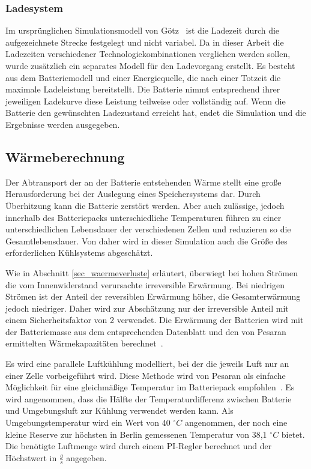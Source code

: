 \subsubsection{Ladesystem}
Im ursprünglichen Simulationsmodell von Götz~\cite{Gotz:2013} ist die Ladezeit durch die aufgezeichnete Strecke festgelegt und nicht variabel. Da in dieser Arbeit die Ladezeiten verschiedener Technologiekombinationen verglichen werden sollen, wurde zusätzlich ein separates Modell für den Ladevorgang erstellt. Es besteht aus dem Batteriemodell und einer Energiequelle, die nach einer Totzeit die maximale Ladeleistung bereitstellt. Die Batterie nimmt entsprechend ihrer jeweiligen Ladekurve diese Leistung teilweise oder vollständig auf. Wenn die Batterie den gewünschten Ladezustand erreicht hat, endet die Simulation und die Ergebnisse werden ausgegeben.

\subsection{Wärmeberechnung}
Der Abtransport der an der Batterie entstehenden Wärme stellt eine große Herausforderung bei der Auslegung eines Speichersystems dar. Durch Überhitzung kann die Batterie zerstört werden. Aber auch zulässige, jedoch innerhalb des Batteriepacks unterschiedliche Temperaturen führen zu einer unterschiedlichen Lebensdauer der verschiedenen Zellen und reduzieren so die Gesamtlebensdauer. Von daher wird in dieser Simulation auch die Größe des erforderlichen Kühlsystems abgeschätzt.

Wie in Abschnitt \ref{sec_waermeverluste} erläutert, überwiegt bei hohen Strömen die vom Innenwiderstand verursachte irreversible Erwärmung. Bei niedrigen Strömen ist der Anteil der reversiblen Erwärmung höher, die Gesamterwärmung jedoch niedriger. Daher wird zur Abschätzung nur der irreversible Anteil mit einem Sicherheitsfaktor von 2 verwendet. Die Erwärmung der Batterien wird mit der Batteriemasse aus dem entsprechenden Datenblatt und den von Pesaran ermittelten Wärmekapazitäten berechnet~\cite{pesaran2001battery}.

Es wird eine parallele Luftkühlung modelliert, bei der die jeweils Luft nur an einer Zelle vorbeigeführt wird. Diese Methode wird von Pesaran als einfache Möglichkeit für eine gleichmäßige Temperatur im Batteriepack empfohlen~\cite{pesaran2001battery}. Es wird angenommen, dass die Hälfte der Temperaturdifferenz zwischen Batterie und Umgebungsluft zur Kühlung verwendet werden kann. Als Umgebungstemperatur wird ein Wert von 40 $^{\circ}C$ angenommen, der noch eine kleine Reserve zur höchsten in Berlin gemessenen Temperatur von 38,1 $^{\circ}C$ bietet\cite{tempRekord}. Die benötigte Luftmenge wird durch einem PI-Regler berechnet und der Höchstwert in $\frac{g}{s}$ angegeben.

